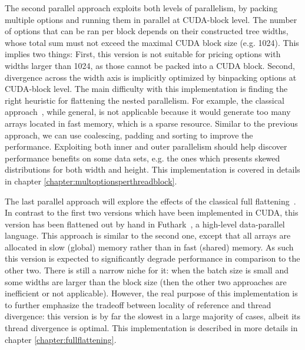 The second parallel approach exploits both levels of parallelism, by packing multiple options and running them in parallel at CUDA-block level. The number of options that can be ran per block depends on their constructed tree widths, whose total sum must not exceed the maximal CUDA block size (e.g. 1024). This implies two things: First, this version is not suitable for pricing options with widths larger than 1024, as those cannot be packed into a CUDA block. Second, divergence across the width axis is implicitly optimized by binpacking options at CUDA-block level. The main difficulty with this implementation is finding the right heuristic for flattening the nested parallelism.  For example, the classical approach~\cite{blelloch1994implementation}, while general, is not applicable because it would generate too many arrays located in fast memory, which is a sparse resource. Similar to the previous approach, we can use coalescing, padding and sorting to improve the performance. Exploiting both inner and outer parallelism should help discover performance benefits on some data sets, e.g. the ones which presents skewed distributions for both width and height. This implementation is covered in details in chapter \ref{chapter:multoptionsperthreadblock}. 

The last parallel approach will explore the effects of the classical full flattening~\cite{blelloch1994implementation}. In contrast to the first two versions which have been implemented in CUDA, this version has been flattened out by hand in Futhark~\cite{henriksen2017futhark}, a high-level data-parallel language.  This approach is similar to the second one, except that all arrays are allocated in slow (global) memory rather than in fast (shared) memory.   As such this version is expected to significantly degrade performance in comparison to the other two. There is still a narrow niche for it: when the batch size is small and some widths are larger than the block size (then the other two approaches are inefficient or not applicable). However, the real purpose of this implementation is to further emphasize the tradeoff between locality of reference and thread divergence: this version is by far the slowest in a large majority of cases, albeit its thread divergence is optimal.   This implementation is described in more details in chapter \ref{chapter:fullflattening}.

